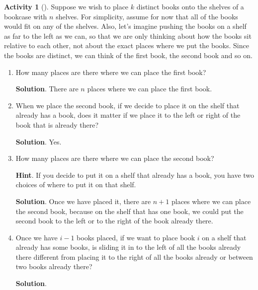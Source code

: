 \documentclass[10pt,]{book}
\theoremstyle{plain}
\theoremstyle{definition}
\theoremstyle{definition}
\theoremstyle{definition}
\newtheorem{activity}[project]{Activity}
\numberwithin{equation}{chapter}
\begin{document}
\begin{activity}[]\label{bookcase}
\hypertarget{p-827}{}%
Suppose we wish to place \(k\) distinct books onto the shelves of a bookcase with \(n\) shelves. For simplicity, assume for now that all of the books would fit on any of the shelves. Also, let's imagine pushing the books on a shelf as far to the left as we can, so that we are only thinking about how the books sit relative to each other, not about the exact places where we put the books. Since the books are distinct, we can think of the first book, the second book and so on.%
\begin{enumerate}[font=\bfseries,label=(\alph*),ref=\alph*]
\item\label{task-161} \hypertarget{p-828}{}%
How many places are there where we can place the first book?%
\par\smallskip%
\noindent\textbf{Solution}.\hypertarget{solution-61}{}\quad%
\hypertarget{p-829}{}%
There are \(n\) places where we can place the first book.%
\item\label{task-162} \hypertarget{p-830}{}%
When we place the second book, if we decide to place it on the shelf that already has a book, does it matter if we place it to the left or right of the book that is already there?%
\par\smallskip%
\noindent\textbf{Solution}.\hypertarget{solution-62}{}\quad%
\hypertarget{p-831}{}%
Yes.%
\item\label{task-163} \hypertarget{p-832}{}%
How many places are there where we can place the second book?%
\par\smallskip%
\noindent\textbf{Hint}.\hypertarget{hint-80}{}\quad%
\hypertarget{p-833}{}%
If you decide to put it on a shelf that already has a book, you have two choices of where to put it on that shelf.%
\par\smallskip%
\noindent\textbf{Solution}.\hypertarget{solution-63}{}\quad%
\hypertarget{p-834}{}%
Once we have placed it, there are \(n+1\) places where we can place the second book, because on the shelf that has one book, we could put the second book to the left or to the right of the book already there.%
\item\label{task-164} \hypertarget{p-835}{}%
Once we have \(i-1\) books placed, if we want to place book \(i\)  on a shelf that already has some books, is sliding it in to the left of all the books already there different from placing it to the right of all the books already or between two books already there?%
\par\smallskip%
\noindent\textbf{Solution}.\hypertarget{solution-64}{}\quad%

\end{enumerate}
\end{activity}
\end{document}
